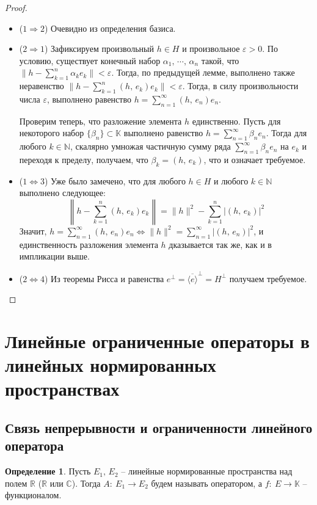 \documentclass[a4paper,12pt]{article}
\theoremstyle{plain}
\theoremstyle{definition}
\newtheorem{definition}{Определение}[section]
\theoremstyle{remark}
\begin{document}
\begin{proof}
	\begin{itemize}
		\item ($1 \Rightarrow 2$) Очевидно из определения базиса.
		\item ($2 \Rightarrow 1$) Зафиксируем произвольный $h \in H$ и произвольное $\varepsilon > 0$. По условию, существует конечный набор $\alpha_1,\,\cdots,\,\alpha_n$ такой, что $\|h - \sum_{k = 1}^n \alpha_ke_k\| < \varepsilon$. Тогда, по предыдущей лемме, выполнено также неравенство $\|h - \sum_{k = 1}^n (h,\,e_k)e_k\| < \varepsilon$. Тогда, в силу произвольности числа $\varepsilon$, выполнено равенство $h = \sum_{n = 1}^\infty (h,\, e_n)e_n$.

		      Проверим теперь, что разложение элемента $h$ единственно. Пусть для некоторого набор $\{\beta_n\} \subset \mathbb{K}$ выполнено равенство $h = \sum_{n = 1}^\infty \beta_ne_n$. Тогда для любого $k \in \mathbb{N}$, скалярно умножая частичную сумму ряда $\sum_{n = 1}^\infty \beta_ne_n$ на $e_k$ и переходя к пределу, получаем, что $\beta_k = (h,\,e_k)$, что и означает требуемое.
		\item ($1 \Leftrightarrow 3$) Уже было замечено, что для любого $h \in H$ и любого $k \in \mathbb{N}$ выполнено следующее:
		      \[
			      \left\|h - \sum_{k = 1}^n (h,\, e_k)e_k\right\| = \|h\|^2 - \sum_{k = 1}^n \vert(h,\, e_k)\vert^2
		      \]
		      Значит, $h = \sum_{n = 1}^\infty (h,\,e_n)e_n \Leftrightarrow \|h\|^2 = \sum_{n = 1}^\infty \vert (h,\, e_n)\vert^2$, и единственность разложения элемента $h$ дказывается так же, как и в импликации выше.

		\item ($2 \Leftrightarrow 4$) Из теоремы Рисса и равенства $e^\bot = \overline{\langle e\rangle}^\bot = H^\bot$ получаем требуемое.
	\end{itemize}
\end{proof}

\section{Линейные ограниченные операторы в линейных нормированных пространствах}
\subsection{Связь непрерывности и ограниченности линейного оператора}
\begin{definition}
  Пусть $E_1,\,E_2$ -- линейные нормированные пространства над полем $\mathbb{R}$ ($\mathbb{R}$ или $\mathbb{C}$). Тогда $A :\: E_1 \to E_2$ будем называть оператором, а $f :\: E \to \mathbb{K}$ -- функционалом.
\end{definition}
\end{document}
